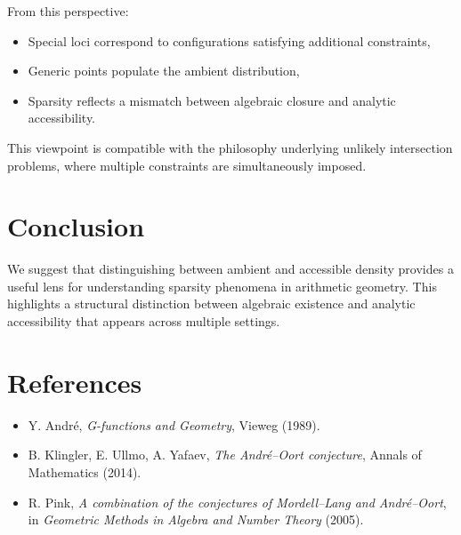 \documentclass[11pt]{article}
\begin{document}
From this perspective:

\begin{itemize}
    \item Special loci correspond to configurations satisfying additional constraints,
    \item Generic points populate the ambient distribution,
    \item Sparsity reflects a mismatch between algebraic closure and analytic accessibility.
\end{itemize}

This viewpoint is compatible with the philosophy underlying unlikely intersection problems, where multiple constraints are simultaneously imposed.

\section{Conclusion}

We suggest that distinguishing between ambient and accessible density provides a useful lens for understanding sparsity phenomena in arithmetic geometry. This highlights a structural distinction between algebraic existence and analytic accessibility that appears across multiple settings.

\section*{References}

\begin{itemize}
    \item Y. André, \emph{G-functions and Geometry}, Vieweg (1989).
    \item B. Klingler, E. Ullmo, A. Yafaev, \emph{The André--Oort conjecture}, Annals of Mathematics (2014).
    \item R. Pink, \emph{A combination of the conjectures of Mordell--Lang and André--Oort}, in \emph{Geometric Methods in Algebra and Number Theory} (2005).
\end{itemize}
\end{document}
